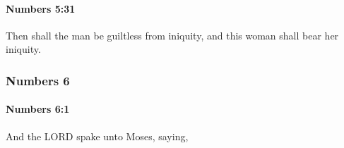 		\paragraph{Numbers 5:31} %
			\label{NUMBERS-5-31}

			Then shall the man be guiltless from iniquity, and this woman shall bear her iniquity.

	\subsubsection{Numbers 6} %
		\label{NUMBERS-6}

		\paragraph{Numbers 6:1} %
			\label{NUMBERS-6-1}

			And the LORD spake unto Moses, saying,


